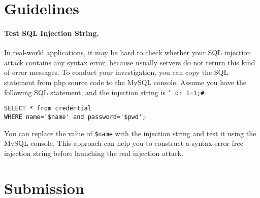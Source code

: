 \section{Guidelines}
\label{sec:guidelines}

\paragraph{Test SQL Injection String.}
In real-world applications, it may be hard to check whether your SQL injection attack contains
any syntax error, because usually servers do not return this kind of error messages. 
To conduct your investigation, you can copy the SQL statement from php source code to the MySQL console. 
Assume you have the following SQL statement, and the injection string is {\tt ' or 1=1;\#}. 

\begin{lstlisting}
SELECT * from credential 
WHERE name='$name' and password='$pwd';
\end{lstlisting}

You can replace the value of {\tt \$name} with the
injection string and test it using the MySQL console. 
This approach can help you to construct a syntax-error 
free injection string before launching the real injection attack. 



\section{Submission}














